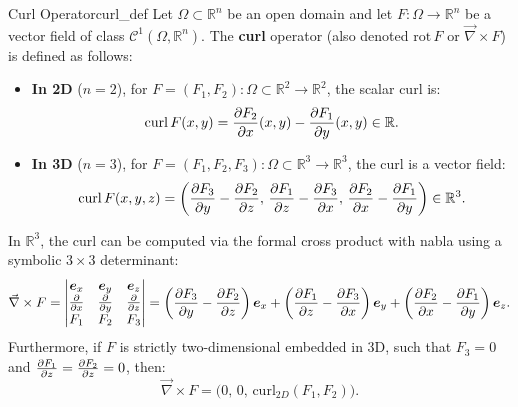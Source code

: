 \begin{definition}{Curl Operator}{curl_def}
Let $\Omega \subset \mathbb{R}^n$ be an open domain and let $F : \Omega \to \mathbb{R}^n$ be a vector field of class $\mathcal{C}^1(\Omega, \mathbb{R}^n)$. The \textbf{curl} operator (also denoted $\mathrm{rot}\,F$ or $\vec{\nabla} \times F$) is defined as follows:

\begin{itemize}
    \item \textbf{In 2D} ($n = 2$), for $F = (F_1, F_2) : \Omega \subset \mathbb{R}^2 \to \mathbb{R}^2$, the scalar curl is:
    \begin{equation}
        \mathrm{curl}\,F(x, y) = \pdv{F_2}{x}(x, y) - \pdv{F_1}{y}(x, y) \in \mathbb{R}.
    \end{equation}
    \item \textbf{In 3D} ($n = 3$), for $F = (F_1, F_2, F_3) : \Omega \subset \mathbb{R}^3 \to \mathbb{R}^3$, the curl is a vector field:
    \begin{equation}
        \mathrm{curl}\,F(x, y, z) = \left( \pdv{F_3}{y} - \pdv{F_2}{z}, \, \pdv{F_1}{z} - \pdv{F_3}{x}, \, \pdv{F_2}{x} - \pdv{F_1}{y} \right) \in \mathbb{R}^3.
    \end{equation}
\end{itemize}
\end{definition}

\begin{remarque}
In $\mathbb{R}^3$, the curl can be computed via the formal cross product with nabla using a symbolic $3 \times 3$ determinant:
\begin{equation}
    \vec{\nabla} \times F = 
    \begin{vmatrix}
        \bm{e}_x & \bm{e}_y & \bm{e}_z \\
        \pdv{}{x} & \pdv{}{y} & \pdv{}{z} \\
        F_1 & F_2 & F_3
    \end{vmatrix}
    = \left( \pdv{F_3}{y} - \pdv{F_2}{z} \right) \bm{e}_x + \left( \pdv{F_1}{z} - \pdv{F_3}{x} \right) \bm{e}_y + \left( \pdv{F_2}{x} - \pdv{F_1}{y} \right) \bm{e}_z.
\end{equation}
Furthermore, if $F$ is strictly two-dimensional embedded in 3D, such that $F_3 = 0$ and $\pdv{F_1}{z} = \pdv{F_2}{z} = 0$, then:
\begin{equation}
    \vec{\nabla} \times F = \Big( 0, \, 0, \, \mathrm{curl}_{2D}(F_1, F_2) \Big).
\end{equation}
\end{remarque}

